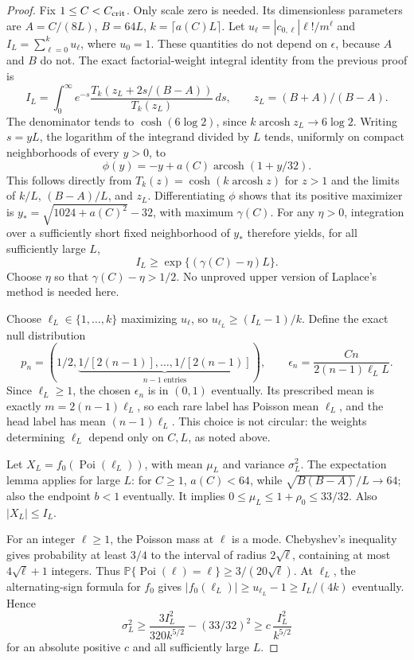 \documentclass[10pt]{article}
\newcommand{\Prb}{\mathbb P}
\begin{document}
\begin{proof}
Fix $1\le C<C_{\rm crit}$. Only scale zero is needed. Its dimensionless
parameters are $A=C/(8L)$, $B=64L$, $k=\lceil a(C)L\rceil$.
Let $u_\ell=|c_{0,\ell}|\ell!/m^\ell$ and
$I_L=\sum_{\ell=0}^k u_\ell$, where $u_0=1$.
These quantities do not depend on $\epsilon$, because $A$ and $B$ do not.
The exact factorial-weight integral identity from the previous proof is
\[
 I_L=\int_0^\infty e^{-s}
 \frac{T_k(z_L+2s/(B-A))}{T_k(z_L)}\,ds,
 \qquad z_L=(B+A)/(B-A).
\]
The denominator tends to $\cosh(6\log2)$, since
$k\operatorname{arcosh}z_L\to6\log2$.
Writing $s=yL$, the logarithm of the integrand divided by $L$ tends,
uniformly on compact neighborhoods of every $y>0$, to
\[
 \phi(y)=-y+a(C)\operatorname{arcosh}(1+y/32).
\]
This follows directly from $T_k(z)=\cosh(k\operatorname{arcosh}z)$ for
$z>1$ and the limits of $k/L$, $(B-A)/L$, and $z_L$.
Differentiating $\phi$ shows that its positive maximizer is
$y_*=\sqrt{1024+a(C)^2}-32$, with maximum $\gamma(C)$.
For any $\eta>0$, integration over a sufficiently short fixed neighborhood
of $y_*$ therefore yields, for all sufficiently large $L$,
\[
 I_L\ge\exp\{(\gamma(C)-\eta)L\}.
\]
Choose $\eta$ so that $\gamma(C)-\eta>1/2$.
No unproved upper version of Laplace's method is needed here.

Choose $\ell_L\in\{1,\ldots,k\}$ maximizing $u_\ell$, so
$u_{\ell_L}\ge(I_L-1)/k$. Define the exact null distribution
\[
 p_n=(1/2,\underbrace{1/[2(n-1)],\ldots,1/[2(n-1)]}_{n-1\text{ entries}}),
 \qquad
 \epsilon_n=\frac{Cn}{2(n-1)\ell_L L}.
\]
Since $\ell_L\ge1$, the chosen $\epsilon_n$ is in $(0,1)$ eventually.
Its prescribed mean is exactly $m=2(n-1)\ell_L$, so each rare label has
Poisson mean $\ell_L$, and the head label has mean $(n-1)\ell_L$.
This choice is not circular: the weights determining $\ell_L$ depend only
on $C,L$, as noted above.

Let $X_L=f_0(\operatorname{Poi}(\ell_L))$, with mean $\mu_L$ and variance
$\sigma_L^2$. The expectation lemma applies for large $L$: for $C\ge1$,
$a(C)<64$, while $\sqrt{B(B-A)}/L\to64$; also the endpoint $b<1$
eventually. It implies $0\le\mu_L\le1+\rho_0\le33/32$.
Also $|X_L|\le I_L$.

For an integer $\ell\ge1$, the Poisson mass at $\ell$ is a mode. Chebyshev's
inequality gives probability at least $3/4$ to the interval of radius
$2\sqrt\ell$, containing at most $4\sqrt\ell+1$ integers. Thus
$\Prb\{\operatorname{Poi}(\ell)=\ell\}\ge3/(20\sqrt\ell)$.
At $\ell_L$, the alternating-sign formula for $f_0$ gives
$|f_0(\ell_L)|\ge u_{\ell_L}-1\ge I_L/(4k)$ eventually. Hence
\[
 \sigma_L^2\ge\frac{3I_L^2}{320k^{5/2}}-(33/32)^2
              \ge c\,\frac{I_L^2}{k^{5/2}}
\]
for an absolute positive $c$ and all sufficiently large $L$.


\end{proof}
\end{document}
